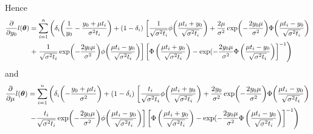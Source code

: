 Hence
\begin{align}
\begin{split}
\frac{\partial}{\partial y_0}
l(\btheta)
&=\sum_{i=1}^n\left(
\di\p*{\frac{1}{y_0}-\frac{y_0+\mu\ti}{\sigma^2\ti}}
+(1-\di)\right.\left[
    \frac{1}{\sqrt{\sigma^2\ti}}\phi\p*{\frac{\mu\ti+y_0}{\sqrt{\sigma^2\ti}}}+\frac{2\mu}{\sigma^2}\exp\p*{-\frac{2y_0\mu}{\sigma^2}}\Phi\p*{\frac{\mu\ti-y_0}{\sqrt{\sigma^2\ti}}}\right.\\
    &\left.+\left.
    \frac{1}{\sqrt{\sigma^2\ti}}\exp\p*{-\frac{2y_0\mu}{\sigma^2}}\phi\p*{\frac{\mu\ti-y_0}{\sqrt{\sigma^2\ti}}}
\right]\left[ \Phi\left(\frac{\mu t_i + y_0}{\sqrt{\sigma^2 t_i}}\right)-\exp(-\frac{2y_0\mu}{\sigma^2}\Phi\left(\frac{\mu t_i - y_0}{\sqrt{\sigma^2 t_i}}\right)\right]^{-1}\right)
\end{split}
\end{align}
and
\begin{align}
\begin{split}
\frac{\partial}{\partial \mu}
l(\btheta)
&=\sum_{i=1}^n\left(
\di\p*{-\frac{y_0+\mu\ti}{\sigma^2}}
+(1-\di)\right.\left[
\frac{\ti}{\sqrt{\sigma^2\ti}}\phi\p*{\frac{\mu\ti+y_0}{\sqrt{\sigma^2\ti}}}+\frac{2y_0}{\sigma^2}\exp\p*{-\frac{2y_0\mu}{\sigma^2}}\Phi\p*{\frac{\mu\ti-y_0}{\sqrt{\sigma^2\ti}}} \right.\\
&\left.\left.-\frac{\ti}{\sqrt{\sigma^2\ti}}\exp\p*{-\frac{2y_0\mu}{\sigma^2}}\phi\p*{\frac{\mu\ti-y_0}{\sqrt{\sigma^2\ti}}}
\right]\left[ \Phi\left(\frac{\mu t_i + y_0}{\sqrt{\sigma^2 t_i}}\right)-\exp(-\frac{2y_0\mu}{\sigma^2}\Phi\left(\frac{\mu t_i - y_0}{\sqrt{\sigma^2 t_i}}\right)\right]^{-1}\right)
\end{split}
\end{align}